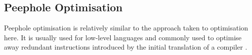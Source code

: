 \subsection{Peephole Optimisation}
Peephole optimisation is relatively similar to the approach taken to optimisation here. It is usually used for low-level languages and commonly used to optimise away redundant instructions introduced by the initial translation of a compiler \cite{aktolgaPatternMatchingStrategies2005}\cite{PeepholeOptimization2019}\cite{bansalAutomaticGenerationPeepholea}.
